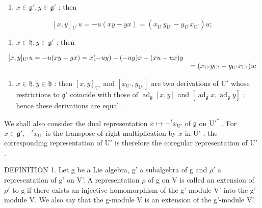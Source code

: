 \begin{enumerate}
\def\labelenumi{(\arabic{enumi})}
\tightlist
\item
  \(x \in \mathfrak{g}', y \in \mathfrak{g}'\) : then
\end{enumerate}

\[
[ x, y ] _ {\mathrm{U} ^ {\prime}} u = - u (x y - y x) = \left(x _ {\mathrm{U} ^ {\prime}} y _ {\mathrm{U} ^ {\prime}} - y _ {\mathrm{U} ^ {\prime}} x _ {\mathrm{U} ^ {\prime}}\right) u;
\]

\begin{enumerate}
\def\labelenumi{(\arabic{enumi})}
\setcounter{enumi}{1}
\tightlist
\item
  \(x \in \mathfrak{h}, y \in \mathfrak{g}'\) : then
\end{enumerate}

\[
\begin{array}{r l} {[ x, y ] _ {\mathrm{U}'} u = - u (x y - y x) = x (- u y) - (- u y) x + (x u - u x) y} \\ & {= (x _ {\mathrm{U}'} y _ {\mathrm{U}'} - y _ {\mathrm{U}'} x _ {\mathrm{U}'}) u;} \end{array}
\]

\begin{enumerate}
\def\labelenumi{(\arabic{enumi})}
\setcounter{enumi}{2}
\tightlist
\item
  \(x \in \mathfrak{h}, y \in \mathfrak{h}\) : then \([x, y]_{\mathrm{U}'}\) and \([x_{\mathrm{U}'}, y_{\mathrm{U}'}]\) are two derivations of \(\mathrm{U}'\) whose restrictions to \(\mathfrak{g}'\) coincide with those of \(\operatorname{ad}_{\mathfrak{g}}[x, y]\) and \([\operatorname{ad}_{\mathfrak{g}}x, \operatorname{ad}_{\mathfrak{g}}y]\) ; hence these derivations are equal.
\end{enumerate}

We shall also consider the dual representation \(x \mapsto -^{t}x_{\mathrm{U}'}\) of \(\mathfrak{g}\) on \(\mathrm{U}'^*\) . For \(x \in \mathfrak{g}', -^{t}x_{\mathrm{U}'}\) is the transpose of right multiplication by \(x\) in \(\mathrm{U}'\) ; the corresponding representation of \(\mathrm{U}'\) is therefore the coregular representation of \(\mathrm{U}'\) .

DEFINITION 1. Let g be a Lie algebra, g' a subalgebra of g and \(\rho'\) a representation of g' on V'. A representation \(\rho\) of g on V is called an extension of \(\rho'\) to g if there exists an injective homomorphism of the g'-module V' into the g'-module V. We also say that the g-module V is an extension of the g'-module V'.

